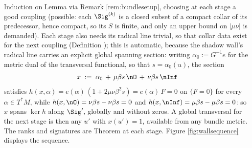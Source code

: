 Induction on Lemma  via Remark \ref{rem:bundlesetup}, choosing at each stage a good coupling (possible: each $\Sig^{(k)}$ is a closed subset of a compact collar of its predecessor, hence compact, so its $S$ is finite, and only an upper bound on $|\mu\nu|$ is demanded). Each stage also needs its radical line trivial, so that collar data exist for the next coupling (Definition ); this is automatic, because the shadow wall's radical line carries an explicit global spanning section: writing $\alpha_0 := G^{-1}e$ for the metric dual of the transversal functional, so that $s = \alpha_0(u)$, the section
\[
x \;:=\; \alpha_0 \,+\, \mu\beta s\, \nO \,+\, \nu\beta s\, \nInf
\]
satisfies $h(x, \alpha) = e(\alpha)\,(1 + 2\mu\nu\beta^2 s) = e(\alpha)\,F = 0$ on $\{F = 0\}$ for every $\alpha \in T^*M$, while $h(x, \nO) = \nu\beta s - \nu\beta s = 0$ and $h(x, \nInf) = \mu\beta s - \mu\beta s = 0$: so $x$ spans $\ker h$ along $\Sig'$, globally and without zeros. A global transversal for the next stage is then any $u'$ with $x(u') = 1$, available from any bundle metric. The ranks and signatures are Theorem  at each stage. Figure \ref{fig:wallsequence} displays the sequence.
